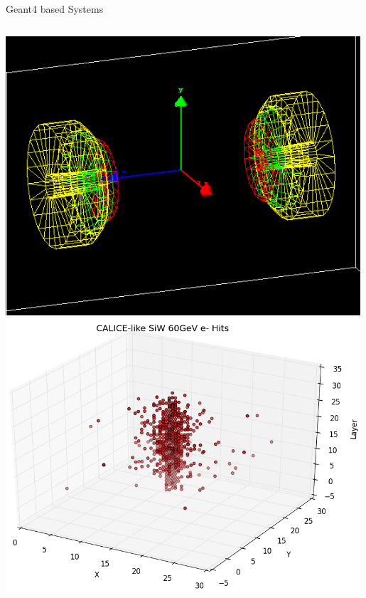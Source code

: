\documentclass[pdf, 9pt]{beamer}
\begin{document}
\begin{frame}{Geant4 based Systems}
\begin{columns}[T]
\begin{column}{0.33\textwidth}
        \includegraphics[width=0.99\textwidth, height=0.3\textheight]{figs/siw/HGC_70_20.png}\\ \vspace{0.3cm}
        \includegraphics[width=0.99\textwidth, height=0.4\textheight]{figs/scatter_3d/scatter_3D_60GeV.png}
      \end{column}
    \end{columns}
  \end{frame}
\end{document}
